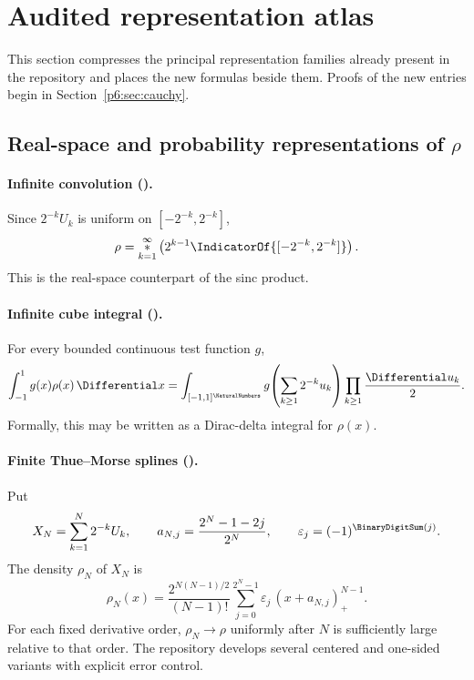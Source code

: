 \documentclass[11pt]{article}
\theoremstyle{definition}
\theoremstyle{remark}
\newcommand{\eps}{\varepsilon}
\begin{document}
\section{Audited representation atlas}

This section compresses the principal representation families already present in the
repository and places the new formulas beside them.  Proofs of the new entries begin in
Section~\ref{p6:sec:cauchy}.

\subsection[Real-space and probability representations of rho]{Real-space and probability representations of \(\rho\)}

\paragraph{Infinite convolution (\statusknownPartl).}
Since \(2^{-k}U_k\) is uniform on \([-2^{-k},2^{-k}]\),
\begin{equation}
 \rho=\mathop{\ast}_{k=1}^{\infty}
 \left(2^{k-1}\IndicatorOf{[-2^{-k},2^{-k}]}\right).        \label{p6:eq:rho-convolution}
\end{equation}
This is the real-space counterpart of the sinc product.

\paragraph{Infinite cube integral (\statusderivedPartl).}
For every bounded continuous test function \(g\),
\begin{equation}
 \int_{-1}^{1}g(x)\rho(x)\,\Differential x
 =\int_{[-1,1]^{\NaturalNumbers}}g\!\left(\sum_{k\ge1}2^{-k}u_k\right)
   \prod_{k\ge1}\frac{\Differential u_k}{2}.                           \label{p6:eq:cube-pushforward}
\end{equation}
Formally, this may be written as a Dirac-delta integral for \(\rho(x)\).

\paragraph{Finite Thue--Morse splines (\statusknownPartl).}
Put
\begin{equation}
 X_N=\sum_{k=1}^{N}2^{-k}U_k,
 \qquad
 a_{N,j}=\frac{2^N-1-2j}{2^N},
 \qquad
 \eps_j=(-1)^{\BinaryDigitSum(j)}.                               \label{p6:eq:aNj}
\end{equation}
The density \(\rho_N\) of \(X_N\) is
\begin{equation}
 \rho_N(x)=\frac{2^{N(N-1)/2}}{(N-1)!}
 \sum_{j=0}^{2^N-1}\eps_j\,(x+a_{N,j})_+^{N-1}.             \label{p6:eq:finite-spline}
\end{equation}
For each fixed derivative order, \(\rho_N\to\rho\) uniformly after \(N\) is sufficiently
large relative to that order.  The repository develops several centered and one-sided
variants with explicit error control.
\end{document}
